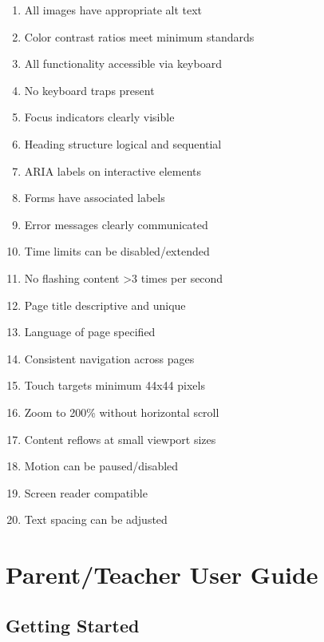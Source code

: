\documentclass[12pt, a4paper]{article}
\begin{document}
\begin{tcolorbox}[colback=lightgray, colframe=primaryblue, title=WCAG 2.1 Compliance Checklist]
\begin{enumerate}[leftmargin=*]
    \item[$\square$] All images have appropriate alt text
    \item[$\square$] Color contrast ratios meet minimum standards
    \item[$\square$] All functionality accessible via keyboard
    \item[$\square$] No keyboard traps present
    \item[$\square$] Focus indicators clearly visible
    \item[$\square$] Heading structure logical and sequential
    \item[$\square$] ARIA labels on interactive elements
    \item[$\square$] Forms have associated labels
    \item[$\square$] Error messages clearly communicated
    \item[$\square$] Time limits can be disabled/extended
    \item[$\square$] No flashing content >3 times per second
    \item[$\square$] Page title descriptive and unique
    \item[$\square$] Language of page specified
    \item[$\square$] Consistent navigation across pages
    \item[$\square$] Touch targets minimum 44x44 pixels
    \item[$\square$] Zoom to 200\% without horizontal scroll
    \item[$\square$] Content reflows at small viewport sizes
    \item[$\square$] Motion can be paused/disabled
    \item[$\square$] Screen reader compatible
    \item[$\square$] Text spacing can be adjusted
\end{enumerate}
\end{tcolorbox}

\section{Parent/Teacher User Guide}

\subsection{Getting Started}
\end{document}
